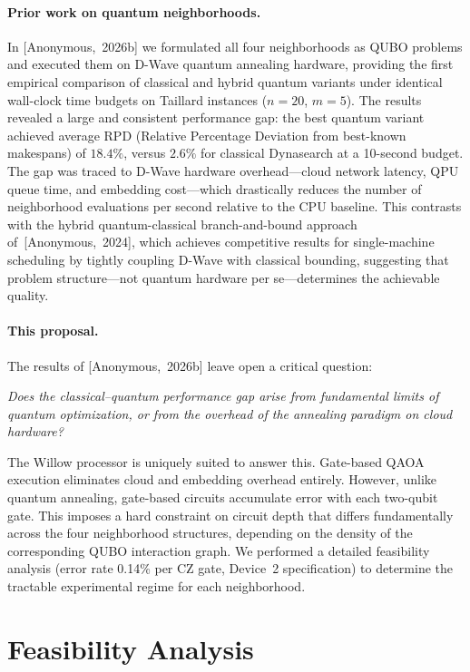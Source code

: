 \documentclass[11pt,a4paper]{article}
\newcommand{\anonB}{[Anonymous,~2026b]}
\newcommand{\anonE}{[Anonymous,~2024]}
\begin{document}
\paragraph{Prior work on quantum neighborhoods.}
In \anonB{} we formulated all four neighborhoods as QUBO problems and
executed them on D-Wave quantum annealing hardware, providing the first
empirical comparison of classical and hybrid quantum variants under
identical wall-clock time budgets on Taillard instances ($n=20$, $m=5$).
The results revealed a large and consistent performance gap: the best
quantum variant achieved average RPD (Relative Percentage Deviation from
best-known makespans) of $18.4\%$, versus $2.6\%$ for classical Dynasearch
at a 10-second budget. The gap was traced to D-Wave hardware
overhead---cloud network latency, QPU queue time, and embedding
cost---which drastically reduces the number of neighborhood evaluations
per second relative to the CPU baseline.
This contrasts with the hybrid quantum-classical branch-and-bound
approach of~\anonE{}, which achieves competitive results for single-machine
scheduling by tightly coupling D-Wave with classical bounding, suggesting
that problem structure---not quantum hardware per se---determines
the achievable quality.

\paragraph{This proposal.}
The results of \anonB{} leave open a critical question:

\begin{center}
\emph{Does the classical--quantum performance gap arise from fundamental
limits of quantum optimization, or from the overhead of the annealing
paradigm on cloud hardware?}
\end{center}

The Willow processor is uniquely suited to answer this. Gate-based QAOA
execution eliminates cloud and embedding overhead entirely. However, unlike
quantum annealing, gate-based circuits accumulate error with each two-qubit
gate. This imposes a hard constraint on circuit depth that differs
fundamentally across the four neighborhood structures, depending on the
density of the corresponding QUBO interaction graph. We performed a
detailed feasibility analysis (error rate 0.14\% per CZ gate, Device~2
specification) to determine the tractable experimental regime for each
neighborhood.

\section*{Feasibility Analysis}
\end{document}
